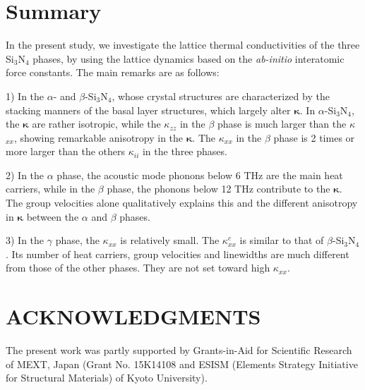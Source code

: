 \documentclass[twocolumn,amsmath,amssymb,a4paper,prb,superscriptaddress,floatfix]{revtex4-1}
\begin{document}

\section{Summary}

In the present study, we investigate the lattice thermal conductivities of the
three Si$_3$N$_4$ phases, by using the lattice dynamics based on the {\it
ab-initio} interatomic force constants. The main remarks are as follows:

1) In the $\alpha$- and $\beta$-Si$_3$N$_4$, whose crystal structures are
characterized by the stacking manners of the basal layer structures, which
largely alter $\boldsymbol{\kappa}$. In $\alpha$-Si$_3$N$_4$, the
$\boldsymbol{\kappa}$ are rather isotropic, while the $\kappa$$_{zz}$ in the
$\beta$ phase is much larger than the $\kappa$$_{xx}$, showing remarkable
anisotropy in the $\boldsymbol{\kappa}$. The $\kappa_{xx}$ in the $\beta$ phase
is 2 times or more larger than the others $\kappa_{ii}$ in the three phases.

2) In the $\alpha$ phase, the acoustic mode phonons below 6 THz are the main
heat carriers, while in the $\beta$ phase, the phonons below 12 THz contribute
to the $\boldsymbol{\kappa}$. The group velocities alone qualitatively explains
this and the different anisotropy in $\boldsymbol{\kappa}$ between the $\alpha$
and $\beta$ phases.

3) In the $\gamma$ phase, the $\kappa_{xx}$ is relatively small. The
$\kappa^c_{xx}$ is similar to that of $\beta$-Si$_3$N$_4$.  Its number of heat
carriers, group
velocities and linewidths are much different from those of the other phases.
They are not set toward high $\kappa_{xx}$.

\section*{ACKNOWLEDGMENTS}
The present work was partly supported by Grants-in-Aid for Scientific
Research of MEXT, Japan (Grant No. 15K14108 and ESISM (Elements Strategy
Initiative for Structural Materials) of Kyoto University).

\appendix
\end{document}
